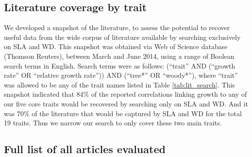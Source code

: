 \documentclass[10pt,twoside]{article}\usepackage[]{graphicx}\usepackage[]{color}
\begin{document}
\subsection{Literature coverage by trait}\label{app:literature-snapshot}

We developed a snapshot of the literature, to assess the potential to recover useful data from the wide corpus of literature available by searching exclusively on SLA and WD. This snapshot was obtained via Web of Science database (Thomson Reuters), between March and June 2014, using a range of Boolean search terms in English. Search terms were as follows: (``trait'' AND (``growth rate'' OR ``relative growth rate'')) AND (``tree*'' OR ``woody*''), where ``trait'' was allowed to be any of the trait names listed in Table \ref{tab:lit_search}. This snapshot indicated that 84\% of the reported correlations linking growth to any of our five core traits would be recovered by searching only on SLA and WD. And it was 70\% of the literature that would be captured by SLA and WD for the total 19 traits. Thus we narrow our search to only cover these two main traits.


\subsection{Full list of all articles evaluated}\label{app:literature-list}
\end{document}
